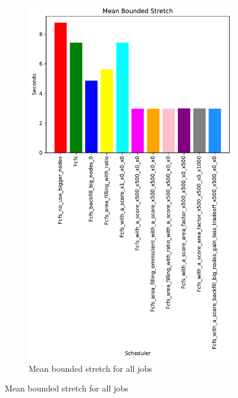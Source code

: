 \documentclass[a4paper]{article}
\begin{document}
\begin{figure}[H]\centering
\begin{subfigure}[b]{0.4\linewidth}\centering\includegraphics[width=0.7\linewidth]{MBSS/plot/Results_Size_And_Data_2022-03-01->2022-03-03_V9271_Mean_Stretch_With_a_Minimum_450_128_32_256_4_1024.pdf}\caption{Mean bounded stretch for all jobs}\label{45}\end{subfigure}

\end{figure}
\end{document}
